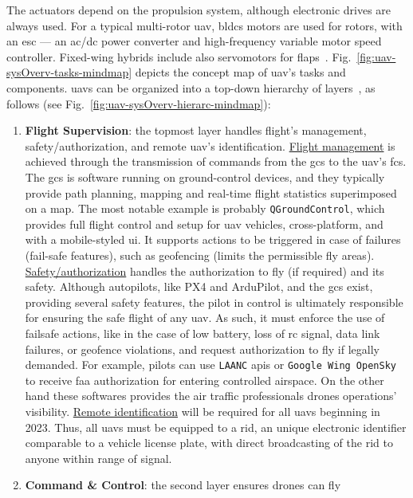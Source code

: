 The actuators depend on the propulsion system, although electronic drives are
always used. For a typical multi-rotor \gls{uav}, \glspl{bldc} motors are used
for rotors, with an \gls{esc} --- an \gls{ac}/\gls{dc} power converter and
high-frequency variable motor speed controller. Fixed-wing hybrids include also
servomotors for flaps~\cite{gabrielBLDCFixedWingUAV2011}.
%
Fig.~\ref{fig:uav-sysOverv-tasks-mindmap} depicts the concept map of \gls{uav}'s
tasks and components.
%
\glspl{uav} can be organized into a top-down hierarchy of layers~\cite{glossner2021overview}, as follows
(see Fig.~\ref{fig:uav-sysOverv-hierarc-mindmap}):
\begin{enumerate}
\item \textbf{Flight Supervision}: the topmost layer handles flight's
  management, safety/authorization, and remote \gls{uav}'s
  identification. \underline{Flight management} is achieved through the
  transmission of commands from the \gls{gcs} to the \gls{uav}'s \gls{fcs}. The \gls{gcs} is
  software running on ground-control devices, and they typically provide path
  planning, mapping and real-time flight statistics superimposed on a map. The
  most notable example is probably \lstinline{QGroundControl}, which provides full
  flight control and setup for \gls{uav} vehicles, cross-platform, and with a
  mobile-styled \gls{ui}. It supports actions to be triggered in case of
  failures (fail-safe features), such as geofencing (limits the permissible fly
  areas). \underline{Safety/authorization} handles the authorization to fly (if
  required) and its safety. Although autopilots, like PX4 and ArduPilot,
  and the \gls{gcs} exist, providing several safety features, the pilot in
  control is ultimately responsible for ensuring the safe flight of any
  \gls{uav}. As such, it must enforce the use of failsafe actions, like in the
  case of low battery, loss of \gls{rc} signal, data link failures, or geofence
  violations, and request authorization to fly if legally demanded. For example,
  pilots can use \lstinline{LAANC} \glspl{api} or
  \lstinline{Google Wing OpenSky} to receive \gls{faa} authorization for entering controlled airspace. On the other
  hand these softwares provides the air traffic professionals drones operations'
  visibility.
  \underline{Remote identification} will be required for all \glspl{uav}
  beginning in 2023. Thus, all \glspl{uav} must be equipped to a \gls{rid}, an
  unique electronic identifier comparable to a vehicle license plate, with direct
  broadcasting of the \gls{rid} to anyone within range of signal.
\item \textbf{Command \& Control}: the second layer ensures drones can fly

\end{enumerate}
